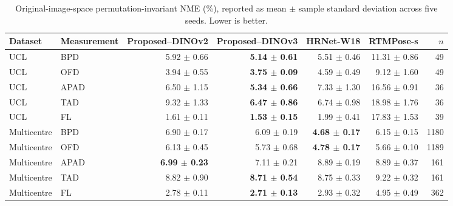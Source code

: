 \begin{table}[t]
\centering
\caption{Original-image-space permutation-invariant NME (\%), reported as mean $\pm$ sample standard deviation across five seeds. Lower is better.}
\label{tab:four_model_main}
\begin{tabular}{llrrrrr}
\toprule
Dataset & Measurement & Proposed--DINOv2 & Proposed--DINOv3 & HRNet-W18 & RTMPose-s & $n$ \\
\midrule
UCL & BPD & 5.92 $\pm$ 0.66 & \textbf{5.14 $\pm$ 0.61} & 5.51 $\pm$ 0.46 & 11.31 $\pm$ 0.86 & 49 \\
UCL & OFD & 3.94 $\pm$ 0.55 & \textbf{3.75 $\pm$ 0.09} & 4.59 $\pm$ 0.49 & 9.12 $\pm$ 1.60 & 49 \\
UCL & APAD & 6.50 $\pm$ 1.15 & \textbf{5.34 $\pm$ 0.66} & 7.33 $\pm$ 1.30 & 16.56 $\pm$ 0.91 & 36 \\
UCL & TAD & 9.32 $\pm$ 1.33 & \textbf{6.47 $\pm$ 0.86} & 6.74 $\pm$ 0.98 & 18.98 $\pm$ 1.76 & 36 \\
UCL & FL & 1.61 $\pm$ 0.11 & \textbf{1.53 $\pm$ 0.15} & 1.99 $\pm$ 0.41 & 17.83 $\pm$ 1.53 & 39 \\
\midrule
Multicentre & BPD & 6.90 $\pm$ 0.17 & 6.09 $\pm$ 0.19 & \textbf{4.68 $\pm$ 0.17} & 6.15 $\pm$ 0.15 & 1180 \\
Multicentre & OFD & 6.13 $\pm$ 0.45 & 5.73 $\pm$ 0.68 & \textbf{4.78 $\pm$ 0.17} & 5.66 $\pm$ 0.10 & 1189 \\
Multicentre & APAD & \textbf{6.99 $\pm$ 0.23} & 7.11 $\pm$ 0.21 & 8.89 $\pm$ 0.19 & 8.89 $\pm$ 0.37 & 161 \\
Multicentre & TAD & 8.82 $\pm$ 0.90 & \textbf{8.71 $\pm$ 0.54} & 8.75 $\pm$ 0.33 & 9.22 $\pm$ 0.32 & 161 \\
Multicentre & FL & 2.78 $\pm$ 0.11 & \textbf{2.71 $\pm$ 0.13} & 2.93 $\pm$ 0.32 & 4.95 $\pm$ 0.49 & 362 \\
\bottomrule
\end{tabular}
\end{table}
